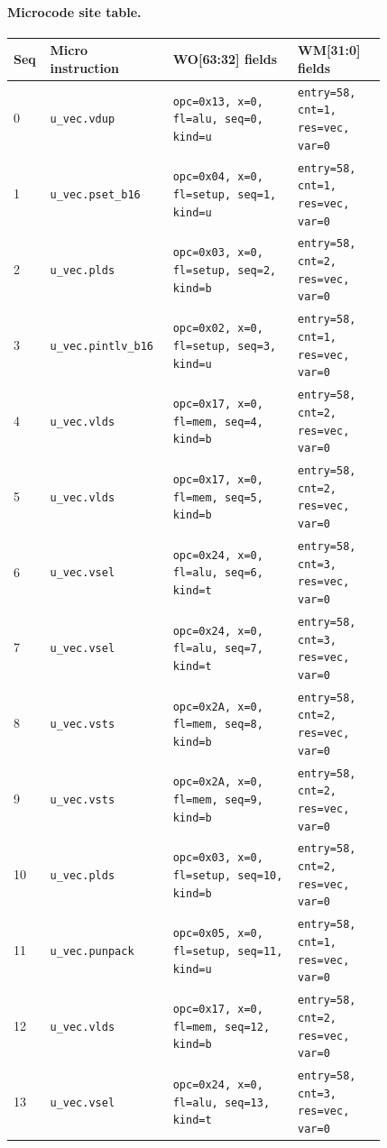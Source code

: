 \paragraph{Microcode site table.}
{\scriptsize
\begin{longtable}{@{}R{0.055\linewidth}L{0.23\linewidth}L{0.31\linewidth}L{0.22\linewidth}@{}}
\toprule
Seq & Micro instruction & WO[63:32] fields & WM[31:0] fields \\
 & \texttt{u\_vec.vdup} & \texttt{opc=0x13, x=0, fl=alu, seq=0, kind=u} & \texttt{entry=58, cnt=1, res=vec, var=0} \\
1 & \texttt{u\_vec.pset\_b16} & \texttt{opc=0x04, x=0, fl=setup, seq=1, kind=u} & \texttt{entry=58, cnt=1, res=vec, var=0} \\
2 & \texttt{u\_vec.plds} & \texttt{opc=0x03, x=0, fl=setup, seq=2, kind=b} & \texttt{entry=58, cnt=2, res=vec, var=0} \\
3 & \texttt{u\_vec.pintlv\_b16} & \texttt{opc=0x02, x=0, fl=setup, seq=3, kind=u} & \texttt{entry=58, cnt=1, res=vec, var=0} \\
4 & \texttt{u\_vec.vlds} & \texttt{opc=0x17, x=0, fl=mem, seq=4, kind=b} & \texttt{entry=58, cnt=2, res=vec, var=0} \\
5 & \texttt{u\_vec.vlds} & \texttt{opc=0x17, x=0, fl=mem, seq=5, kind=b} & \texttt{entry=58, cnt=2, res=vec, var=0} \\
6 & \texttt{u\_vec.vsel} & \texttt{opc=0x24, x=0, fl=alu, seq=6, kind=t} & \texttt{entry=58, cnt=3, res=vec, var=0} \\
7 & \texttt{u\_vec.vsel} & \texttt{opc=0x24, x=0, fl=alu, seq=7, kind=t} & \texttt{entry=58, cnt=3, res=vec, var=0} \\
8 & \texttt{u\_vec.vsts} & \texttt{opc=0x2A, x=0, fl=mem, seq=8, kind=b} & \texttt{entry=58, cnt=2, res=vec, var=0} \\
9 & \texttt{u\_vec.vsts} & \texttt{opc=0x2A, x=0, fl=mem, seq=9, kind=b} & \texttt{entry=58, cnt=2, res=vec, var=0} \\
10 & \texttt{u\_vec.plds} & \texttt{opc=0x03, x=0, fl=setup, seq=10, kind=b} & \texttt{entry=58, cnt=2, res=vec, var=0} \\
11 & \texttt{u\_vec.punpack} & \texttt{opc=0x05, x=0, fl=setup, seq=11, kind=u} & \texttt{entry=58, cnt=1, res=vec, var=0} \\
12 & \texttt{u\_vec.vlds} & \texttt{opc=0x17, x=0, fl=mem, seq=12, kind=b} & \texttt{entry=58, cnt=2, res=vec, var=0} \\
13 & \texttt{u\_vec.vsel} & \texttt{opc=0x24, x=0, fl=alu, seq=13, kind=t} & \texttt{entry=58, cnt=3, res=vec, var=0} \\

\end{longtable}}

